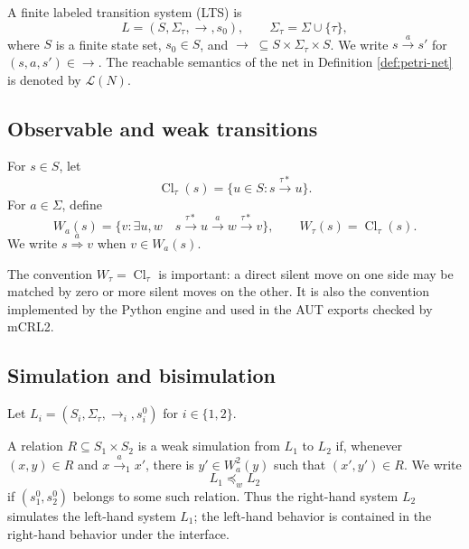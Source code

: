 \documentclass{ws-jbcb}
\numberwithin{equation}{section}
\newcommand{\TAU}{\tau}
\newcommand{\xRightarrow}[1]{\stackrel{#1}{\Longrightarrow}}
\newcommand{\LTS}{\mathcal{L}}
\newcommand{\weakpre}{\mathrel{\preceq_{w}}}
\begin{document}
\begin{definition}\label{def:lts}
A finite labeled transition system (LTS) is
\begin{equation}\label{eq:lts}
 L=(S,\Sigma_{\TAU},\longrightarrow,s_0),\qquad
 \Sigma_{\TAU}=\Sigma\cup\{\TAU\},
\end{equation}
where $S$ is a finite state set, $s_0\in S$, and
$\longrightarrow\;\subseteq S\times\Sigma_{\TAU}\times S$. We write
$s\xrightarrow{a}s'$ for $(s,a,s')\in\longrightarrow$. The reachable semantics
of the net in Definition \ref{def:petri-net} is denoted by $\LTS(N)$.
\end{definition}

\subsection{Observable and weak transitions}\label{sec:weak-transitions}

\begin{definition}\label{def:weak-move}
For $s\in S$, let
\begin{equation}\label{eq:tau-closure}
 \operatorname{Cl}_{\TAU}(s)=
 \{u\in S:s\xrightarrow{\TAU *}u\}.
\end{equation}
For $a\in\Sigma$, define
\begin{equation}\label{eq:weak-target}
 W_a(s)=\{v:\exists u,w\quad
 s\xrightarrow{\TAU *}u\xrightarrow{a}w\xrightarrow{\TAU *}v\},
 \qquad W_{\TAU}(s)=\operatorname{Cl}_{\TAU}(s).
\end{equation}
We write $s\xRightarrow{a}v$ when $v\in W_a(s)$.
\end{definition}

The convention $W_{\TAU}=\operatorname{Cl}_{\TAU}$ is important: a direct silent
move on one side may be matched by zero or more silent moves on the other. It is
also the convention implemented by the Python engine and used in the AUT exports
checked by mCRL2.

\subsection{Simulation and bisimulation}\label{sec:relations}

Let $L_i=(S_i,\Sigma_{\TAU},\longrightarrow_i,s_i^0)$ for $i\in\{1,2\}$.

\begin{definition}\label{def:weak-simulation}
A relation $R\subseteq S_1\times S_2$ is a weak simulation from $L_1$ to $L_2$
if, whenever $(x,y)\in R$ and $x\xrightarrow{a}_1x'$, there is
$y'\in W_a^2(y)$ such that $(x',y')\in R$. We write
\begin{equation}\label{eq:simulation-orientation}
 L_1\weakpre L_2
\end{equation}
if $(s_1^0,s_2^0)$ belongs to some such relation. Thus the right-hand system
$L_2$ simulates the left-hand system $L_1$; the left-hand behavior is contained
in the right-hand behavior under the interface.
\end{definition}
\end{document}
